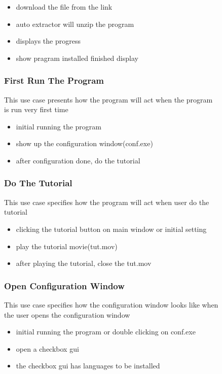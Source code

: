 \documentclass[conference]{IEEEtran}
\begin{document}
\begin{itemize}
\begin{itemize}
\begin{itemize}
\begin{itemize}
\begin{figure}[h]
\begin{enumerate}
\begin{itemize}
\begin{enumerate}
\begin{itemize}
  \item download the file from the link
  \item auto extractor will unzip the program
  \item displays the progress
  \item show pragram installed finished display
\end{itemize}
\textit{}



\subsubsection{First Run The Program}
This use case presents how the program will act when the program is run very first time
\begin{itemize}
  \item initial running the program
  \item show up the configuration window(conf.exe)
  \item after configuration done, do the tutorial
\end{itemize}
\textit{}



\subsubsection{Do The Tutorial}
This use case specifies how the program will act when user do the tutorial
\begin{itemize}
  \item clicking the tutorial button on main window or initial setting 
  \item play the tutorial movie(tut.mov)
  \item after playing the tutorial, close the tut.mov
\end{itemize}
\textit{}



\subsubsection{Open Configuration Window}
This use case specifies how the configuration window looks like when the user opens the configuration window
\begin{itemize}
  \item initial running the program or double clicking on conf.exe
  \item open a checkbox gui
  \item the checkbox gui has languages to be installed
\end{itemize}
\textit{}




\end{enumerate}
\end{itemize}
\end{enumerate}
\end{figure}
\end{itemize}
\end{itemize}
\end{itemize}
\end{itemize}
\end{document}
